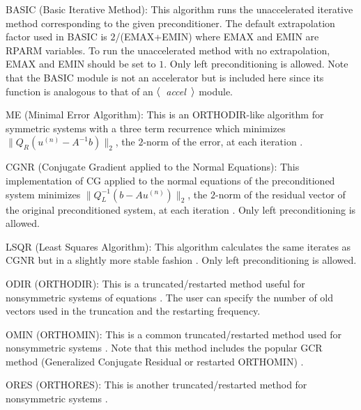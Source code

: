 \begin{list}{}{
               \leftmargin 1.00in \rightmargin 0.25in}
\item[BASIC \hfill](Basic Iterative Method):
      This algorithm runs the unaccelerated iterative method
      corresponding to the given preconditioner.  The default 
      extrapolation factor used in BASIC is $2$/(EMAX+EMIN) where 
      EMAX and EMIN are RPARM variables.  To run the unaccelerated
      method with no extrapolation, EMAX and EMIN should be
      set to $1$.  Only left preconditioning is allowed.
      Note that the BASIC module is not an accelerator
      but is included here since its function is analogous 
      to that of an $\langle$~{\em accel}~$\rangle$ module.
 
\item[ME \hfill](Minimal Error Algorithm):
      This is an ORTHODIR-like algorithm for symmetric systems
      with a three term recurrence which minimizes 
      $\|Q_R(u^{(n)}-A^{-1}b)\|_2$, the $2$-norm of the error, 
      at each iteration \cite{ME}.
 
\item[CGNR \hfill](Conjugate Gradient applied to the Normal Equations):
      This implementation of CG applied to the normal equations
      of the preconditioned system minimizes 
      $\|Q_L^{-1}(b-Au^{(n)})\|_2$, the $2$-norm of the residual 
      vector of the original preconditioned system, at each iteration 
      \cite{LSQR}.  Only left preconditioning is allowed.
 
\item[LSQR \hfill](Least Squares Algorithm):
      This algorithm calculates the same iterates as CGNR but in
      a slightly more stable fashion \cite{LSQR}.
      Only left preconditioning is allowed.
 
\item[ODIR \hfill](ORTHODIR):
      This is a truncated/restarted method useful for nonsymmetric
      systems of equations \cite{ORTHO}.  The user can specify
      the number of old vectors used in the truncation and
      the restarting frequency.
 
\item[OMIN \hfill](ORTHOMIN):
      This is a common truncated/restarted method used for
      nonsymmetric systems \cite{ORTHO}.  Note that this method
      includes the popular GCR method (Generalized Conjugate
      Residual or restarted ORTHOMIN) \cite{GCR}.
 
\item[ORES \hfill](ORTHORES):
      This is another truncated/restarted method for nonsymmetric
      systems \cite{ORTHO}.
 

\end{list}
